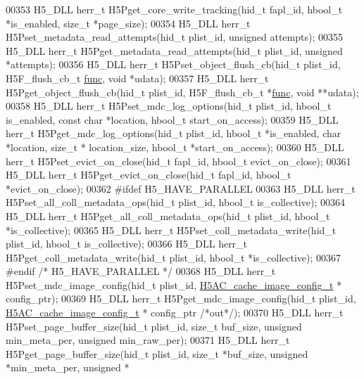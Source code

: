 \begin{DoxyCode}
00353 H5\_DLL herr\_t H5Pget\_core\_write\_tracking(hid\_t fapl\_id, hbool\_t *is\_enabled, \textcolor{keywordtype}{size\_t} *page\_size);
00354 H5\_DLL herr\_t H5Pset\_metadata\_read\_attempts(hid\_t plist\_id, \textcolor{keywordtype}{unsigned} attempts);
00355 H5\_DLL herr\_t H5Pget\_metadata\_read\_attempts(hid\_t plist\_id, \textcolor{keywordtype}{unsigned} *attempts);
00356 H5\_DLL herr\_t H5Pset\_object\_flush\_cb(hid\_t plist\_id, H5F\_flush\_cb\_t \hyperlink{structfunc}{func}, \textcolor{keywordtype}{void} *udata);
00357 H5\_DLL herr\_t H5Pget\_object\_flush\_cb(hid\_t plist\_id, H5F\_flush\_cb\_t *\hyperlink{structfunc}{func}, \textcolor{keywordtype}{void} **udata);
00358 H5\_DLL herr\_t H5Pset\_mdc\_log\_options(hid\_t plist\_id, hbool\_t is\_enabled, \textcolor{keyword}{const} \textcolor{keywordtype}{char} *location, hbool\_t 
      start\_on\_access);
00359 H5\_DLL herr\_t H5Pget\_mdc\_log\_options(hid\_t plist\_id, hbool\_t *is\_enabled, \textcolor{keywordtype}{char} *location, \textcolor{keywordtype}{size\_t} *
      location\_size, hbool\_t *start\_on\_access);
00360 H5\_DLL herr\_t H5Pset\_evict\_on\_close(hid\_t fapl\_id, hbool\_t evict\_on\_close);
00361 H5\_DLL herr\_t H5Pget\_evict\_on\_close(hid\_t fapl\_id, hbool\_t *evict\_on\_close);
00362 \textcolor{preprocessor}{#ifdef H5\_HAVE\_PARALLEL}
00363 H5\_DLL herr\_t H5Pset\_all\_coll\_metadata\_ops(hid\_t plist\_id, hbool\_t is\_collective);
00364 H5\_DLL herr\_t H5Pget\_all\_coll\_metadata\_ops(hid\_t plist\_id, hbool\_t *is\_collective);
00365 H5\_DLL herr\_t H5Pset\_coll\_metadata\_write(hid\_t plist\_id, hbool\_t is\_collective);
00366 H5\_DLL herr\_t H5Pget\_coll\_metadata\_write(hid\_t plist\_id, hbool\_t *is\_collective);
00367 \textcolor{preprocessor}{#endif }\textcolor{comment}{/* H5\_HAVE\_PARALLEL */}\textcolor{preprocessor}{}
00368 H5\_DLL herr\_t H5Pset\_mdc\_image\_config(hid\_t plist\_id, \hyperlink{struct_h5_a_c__cache__image__config__t}{H5AC\_cache\_image\_config\_t} *
      config\_ptr);
00369 H5\_DLL herr\_t H5Pget\_mdc\_image\_config(hid\_t plist\_id, \hyperlink{struct_h5_a_c__cache__image__config__t}{H5AC\_cache\_image\_config\_t} *
      config\_ptr \textcolor{comment}{/*out*/});
00370 H5\_DLL herr\_t H5Pset\_page\_buffer\_size(hid\_t plist\_id, \textcolor{keywordtype}{size\_t} buf\_size, \textcolor{keywordtype}{unsigned} min\_meta\_per, \textcolor{keywordtype}{unsigned} 
      min\_raw\_per);
00371 H5\_DLL herr\_t H5Pget\_page\_buffer\_size(hid\_t plist\_id, \textcolor{keywordtype}{size\_t} *buf\_size, \textcolor{keywordtype}{unsigned} *min\_meta\_per, \textcolor{keywordtype}{unsigned} *

\end{DoxyCode}

